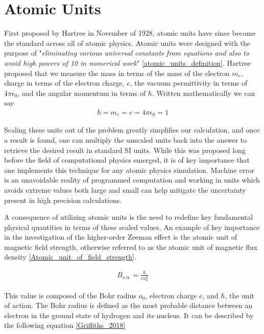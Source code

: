     \section{Atomic Units} \label{sec:atomic_units}    
        First proposed by Hartree in November of 1928, atomic units have since become the standard across all of atomic physics. Atomic units were designed with the purpose of "\textit{eliminating various universal constants from equations and also to avoid high powers of 10 in numerical work}" \ref{atomic_units_definition}. Hartree proposed that we measure the mass in terms of the mass of the electron $m_e$, charge in terms of the electron charge, $e$, the vacuum permittivity in terms of $4\pi \epsilon_0$, and the angular momentum in terms of $\hbar$. Written mathematically we can say
        \begin{align}
            \hbar = m_e = e = 4\pi \epsilon_0 = 1
        \end{align}

        \noindent Scaling these units out of the problem greatly simplifies our calculation, and once a result is found, one can multiply the unscaled units back into the answer to retrieve the desired result in standard SI units. While this was proposed long before the field of computational physics emerged, it is of key importance that one implements this technique for any atomic physics simulation. Machine error is an unavoidable reality of programmed computation and working in units which avoids extreme values both large and small can help mitigate the uncertainty present in high precision calculations.

        A consequence of utilizing atomic units is the need to redefine key fundamental physical quantities in terms of these scaled values. An example of key importance in the investigation of the higher-order Zeeman effect is the atomic unit of magnetic field strength, otherwise referred to as the atomic unit of magnetic flux density \ref{Atomic_unit_of_field_strength}.

        \begin{align}
            B_{\text{a.u.}} = \frac{\hbar}{e a_0^2}
        \end{align}

        This value is composed of the Bohr radius $a_0$, electron charge $e$, and $\hbar$, the unit of action. The Bohr radius is defined as the most probable distance between an electron in the ground state of hydrogen and its nucleus. It can be described by the following equation \ref{Griffiths_2018}

